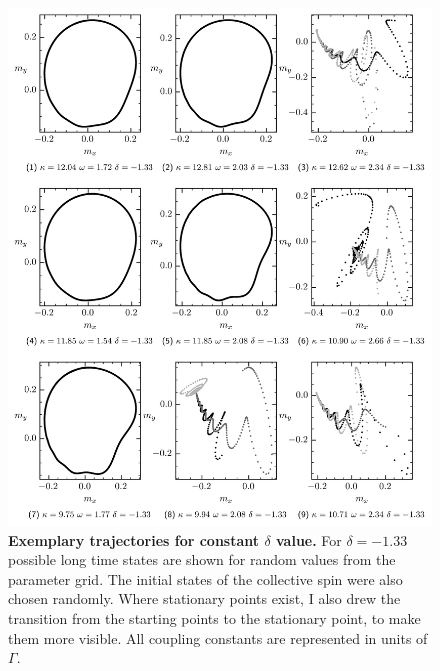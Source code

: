     \begin{figure}[H]
        \centering
        \includegraphics{pictures/lc_traj_dcut2.png}
        \caption{\textbf{Exemplary trajectories for constant $\delta$ value.} For $\delta=-1.33$ possible long time states are shown for random values from the parameter grid. The initial states of the collective spin were also chosen randomly. Where stationary points exist, I also drew the transition from the starting points to the stationary point, to make them more visible. All coupling constants are represented in units of $\Gamma$.}
    \end{figure}\newpage

